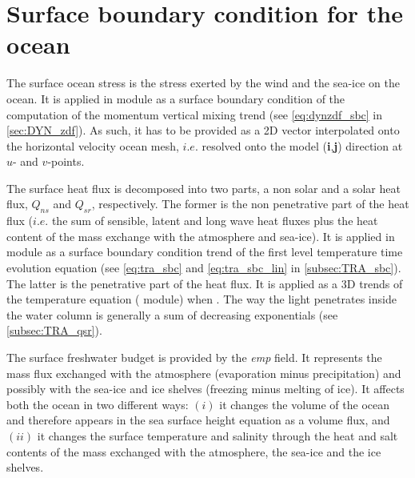 \documentclass[../tex_main/NEMO_manual]{subfiles}
\begin{document}
\section{Surface boundary condition for the ocean}
\label{sec:SBC_general}

The surface ocean stress is the stress exerted by the wind and the sea-ice on the ocean.
It is applied in  module as a surface boundary condition of the computation of
the momentum vertical mixing trend (see \autoref{eq:dynzdf_sbc} in \autoref{sec:DYN_zdf}).
As such, it has to be provided as a 2D vector interpolated onto the horizontal velocity ocean mesh,
$i.e.$ resolved onto the model (\textbf{i},\textbf{j}) direction at $u$- and $v$-points.

The surface heat flux is decomposed into two parts, a non solar and a solar heat flux,
$Q_{ns}$ and $Q_{sr}$, respectively.
The former is the non penetrative part of the heat flux
($i.e.$ the sum of sensible, latent and long wave heat fluxes plus
the heat content of the mass exchange with the atmosphere and sea-ice).
It is applied in  module as a surface boundary condition trend of
the first level temperature time evolution equation
(see \autoref{eq:tra_sbc} and \autoref{eq:tra_sbc_lin} in \autoref{subsec:TRA_sbc}). 
The latter is the penetrative part of the heat flux.
It is applied as a 3D trends of the temperature equation ( module) when
.
The way the light penetrates inside the water column is generally a sum of decreasing exponentials
(see \autoref{subsec:TRA_qsr}). 

The surface freshwater budget is provided by the \textit{emp} field.
It represents the mass flux exchanged with the atmosphere (evaporation minus precipitation) and
possibly with the sea-ice and ice shelves (freezing minus melting of ice).
It affects both the ocean in two different ways:
$(i)$  it changes the volume of the ocean and therefore appears in the sea surface height equation as
a volume flux, and 
$(ii)$ it changes the surface temperature and salinity through the heat and salt contents of
the mass exchanged with the atmosphere, the sea-ice and the ice shelves. 


%
%
%
%
%
%
% 
%
\end{document}
